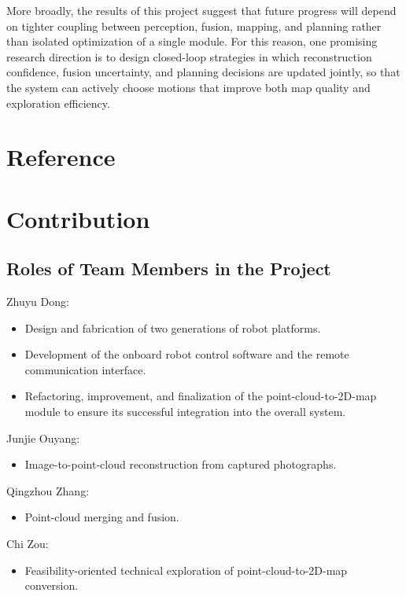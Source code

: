 \documentclass[12pt]{interim_report}
\begin{document}
More broadly, the results of this project suggest that future progress will depend on tighter coupling between perception, fusion, mapping, and planning rather than isolated optimization of a single module. For this reason, one promising research direction is to design closed-loop strategies in which reconstruction confidence, fusion uncertainty, and planning decisions are updated jointly, so that the system can actively choose motions that improve both map quality and exploration efficiency.



\section{Reference}



\section{Contribution}

\subsection{Roles of Team Members in the Project}

Zhuyu Dong:
\begin{itemize}
    \item Design and fabrication of two generations of robot platforms.
    \item Development of the onboard robot control software and the remote communication interface.
    \item Refactoring, improvement, and finalization of the point-cloud-to-2D-map module to ensure its successful integration into the overall system.
\end{itemize}

Junjie Ouyang:
\begin{itemize}
    \item Image-to-point-cloud reconstruction from captured photographs.
\end{itemize}

Qingzhou Zhang:
\begin{itemize}
    \item Point-cloud merging and fusion.
\end{itemize}

Chi Zou:
\begin{itemize}
    \item Feasibility-oriented technical exploration of point-cloud-to-2D-map conversion.
\end{itemize}
\end{document}
